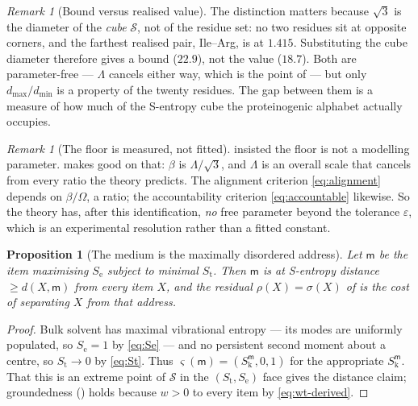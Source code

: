 \documentclass[11pt,twocolumn,a4paper]{article}
\theoremstyle{thmstyle}
\newtheorem{proposition}[theorem]{Proposition}
\theoremstyle{definition}
\theoremstyle{remark}
\newtheorem{remark}[theorem]{Remark}
\newcommand{\wt}{w}
\newcommand{\med}{\mathsf{m}}
\newcommand{\flo}{\beta}
\newcommand{\str}{\sigma}
\newcommand{\res}{\rho}
\newcommand{\Sk}{S_{\mathrm{k}}}
\newcommand{\St}{S_{\mathrm{t}}}
\newcommand{\Se}{S_{\mathrm{e}}}
\newcommand{\Sspace}{\mathcal{S}}
\newcommand{\sse}{\varsigma}
\newcommand{\eps}{\varepsilon}
\begin{document}
\begin{remark}[Bound versus realised value]
\label{rem:ratio-bound}
The distinction matters because $\sqrt3$ is the diameter of the
\emph{cube} $\Sspace$, not of the residue set: no two residues sit at
opposite corners, and the farthest realised pair, Ile--Arg, is at
$1.415$. Substituting the cube diameter therefore gives a bound
($22.9$), not the value ($18.7$). Both are parameter-free --- $\Lambda$
cancels either way, which is the point of  ---
but only $d_{\max}/d_{\min}$ is a property of the twenty residues.
The gap between them is a measure of how much of the S-entropy cube the
proteinogenic alphabet actually occupies.
\end{remark}

\begin{remark}[The floor is measured, not fitted]
\label{rem:floor-measured}
 insisted the floor is not a modelling
parameter.  makes good on that: $\flo$ is
$\Lambda/\sqrt3$, and $\Lambda$ is an overall scale that cancels from
every ratio the theory predicts. The alignment criterion
\eqref{eq:alignment} depends on $\flo/\Omega$, a ratio; the
accountability criterion \eqref{eq:accountable} likewise. So the
theory has, after this identification, \emph{no} free parameter beyond
the tolerance $\eps$, which is an experimental resolution rather than
a fitted constant.
\end{remark}

\begin{proposition}[The medium is the maximally disordered address]
\label{prop:medium-address}
Let $\med$ be the item maximising $\Se$ subject to minimal $\St$.
Then $\med$ is at S-entropy distance $\geq d(X,\med)$ from every
item $X$, and the residual $\res(X) = \str(X)$ of 
is the cost of separating $X$ from that address.
\end{proposition}

\begin{proof}
Bulk solvent has maximal vibrational entropy --- its modes are
uniformly populated, so $\Se = 1$ by \eqref{eq:Se} --- and no
persistent second moment about a centre, so $\St \to 0$ by
\eqref{eq:St}. Thus $\sse(\med) = (\Sk^{\med}, 0, 1)$ for the
appropriate $\Sk^{\med}$. That this is an extreme point of $\Sspace$
in the $(\St,\Se)$ face gives the distance claim; groundedness
() holds because $\wt > 0$ to every item by
\eqref{eq:wt-derived}.
\end{proof}
\end{document}

